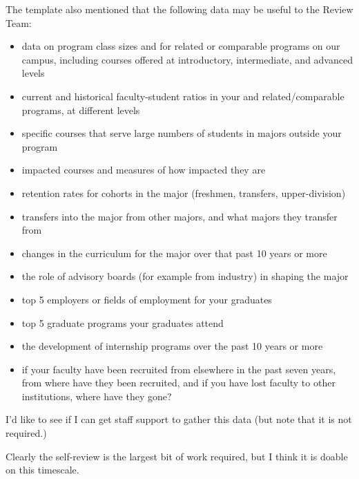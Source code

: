 \documentclass[12pt]{article}
\begin{document}
The template also mentioned that the following data may be useful to the Review Team:
\begin{itemize}
\item data on program class sizes and for related or comparable programs on our campus, including courses offered at introductory, intermediate, and advanced levels
\item current and historical faculty-student ratios in your and related/comparable programs, at different levels
\item specific courses that serve large numbers of students in majors outside your program
\item impacted courses and measures of how impacted they are
\item retention rates for cohorts in the major (freshmen, transfers, upper-division)
\item transfers into the major from other majors, and what majors they transfer from
\item changes in the curriculum for the major over that past 10 years or more
\item the role of advisory boards (for example from industry) in shaping the major
\item top 5 employers or fields of employment for your graduates
\item top 5 graduate programs your graduates attend
\item the development of internship programs over the past 10 years or more
\item if your faculty have been recruited from elsewhere in the past seven years, from where have they been recruited, and if you have lost faculty to other institutions, where have they gone?
\end{itemize}
I'd like to see if I can get staff support to gather this data (but note that it is not required.)

Clearly the self-review is the largest bit of work required, but I think it is doable on this timescale.
\end{document}
